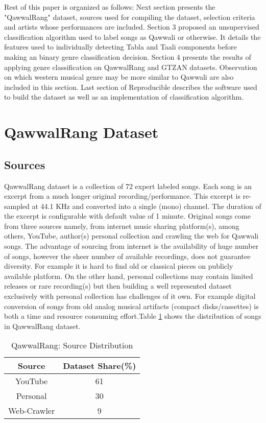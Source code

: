 \documentclass{article}
\begin{document}
Rest of this paper is organized as follows: Next section presents the "QawwalRang" dataset, sources used for compiling the dataset, selection criteria and artists whose performances are included. Section 3 proposed an unsupervised classification algorithm used to label songs as Qawwali or otherwise. It details the features used to individually detecting Tabla and Taali components before making an binary genre classification decision. Section 4 presents the results of applying genre classification on QawwalRang and GTZAN datasets. Observation on which western musical genre may be more similar to Qawwali are also included in this section. Last section of Reproducible describes the software used to build the dataset as well as an implementation of classification algorithm.

\section{QawwalRang Dataset}\label{sec:data}

\subsection{Sources}

QawwalRang dataset is a collection of 72 expert labeled songs. Each song is an excerpt from a much longer original recording/performance. This excerpt is re-sampled at 44.1 KHz and converted into a single (mono) channel. The duration of the excerpt is configurable with default value of 1 minute. Original songs come from three sources namely, from internet music sharing platform(s), among others, YouTube, author(s) personal collection and crawling the web for Qawwali songs. The advantage of sourcing from internet is the availability of huge number of songs, however the sheer number of available recordings, does not guarantee diversity.  For example it is hard to find old or classical pieces on publicly available platform. On the other hand, personal collections may contain limited releases or rare recording(s) but then building a well represented dataset exclusively with personal collection has challenges of it own. For example digital conversion of songs from old analog musical artifacts (compact disks/cassettes) is both a time and resource consuming effort.Table 
\ref{tab:sources} shows the distribution of songs in QawwalRang dataset.
\begin{table}[htpb]
\centering
  \begin{tabular}{|c | c|}
  \toprule
  \bfseries Source & \bfseries Dataset Share(\%) \\
  \hline \hline
  YouTube  & 61 \\
  \hline
  Personal & 30 \\
  \hline
  Web-Crawler & 9  \\
  \bottomrule
  \end{tabular}
  \caption{QawwalRang: Source Distribution}
\label{tab:sources}
\end{table}
\end{document}
